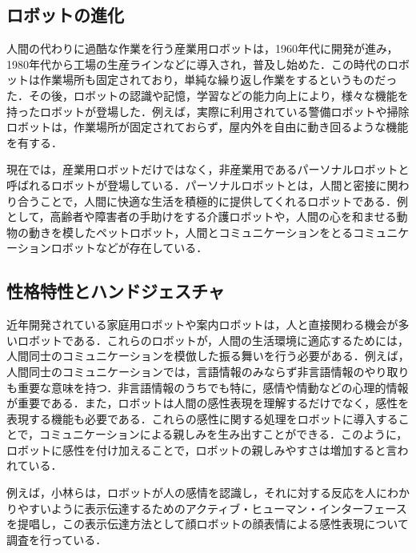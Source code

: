 \subsection{ロボットの進化}
\label{sec2.3.1}

人間の代わりに過酷な作業を行う産業用ロボットは，1960年代に開発が進み，1980年代から工場の生産ラインなどに導入され，普及し始めた．この時代のロボットは作業場所も固定されており，単純な繰り返し作業をするというものだった．その後，ロボットの認識や記憶，学習などの能力向上により，様々な機能を持ったロボットが登場した．例えば，実際に利用されている警備ロボットや掃除ロボットは，作業場所が固定されておらず，屋内外を自由に動き回るような機能を有する．

現在では，産業用ロボットだけではなく，非産業用であるパーソナルロボットと呼ばれるロボットが登場している．パーソナルロボットとは，人間と密接に関わり合うことで，人間に快適な生活を積極的に提供してくれるロボットである\cite{perso}．例として，高齢者や障害者の手助けをする介護ロボットや，人間の心を和ませる動物の動きを模したペットロボット，人間とコミュニケーションをとるコミュニケーションロボットなどが存在している．




\subsection{性格特性とハンドジェスチャ}
\label{sec2.3.2}

近年開発されている家庭用ロボットや案内ロボットは，人と直接関わる機会が多いロボットである．これらのロボットが，人間の生活環境に適応するためには，人間同士のコミュニケーションを模倣した振る舞いを行う必要がある．例えば，人間同士のコミュニケーションでは，言語情報のみならず非言語情報のやり取りも重要な意味を持つ\cite{gengo}．非言語情報のうちでも特に，感情や情動などの心理的情報が重要である．また，ロボットは人間の感性表現を理解するだけでなく，感性を表現する機能も必要である．これらの感性に関する処理をロボットに導入することで，コミュニケーションによる親しみを生み出すことができる．このように，ロボットに感性を付け加えることで，ロボットの親しみやすさは増加すると言われている．

例えば，小林らは，ロボットが人の感情を認識し，それに対する反応を人にわかりやすいように表示伝達するためのアクティブ・ヒューマン・インターフェースを提唱し，この表示伝達方法として顔ロボットの顔表情による感性表現について調査を行っている\cite{gengo}．






\vspace{1cm}
\begin{figure}[!h]
 \begin{center}
  \centering
  \label{fig:kansei}
 \end{center}
\end{figure}


